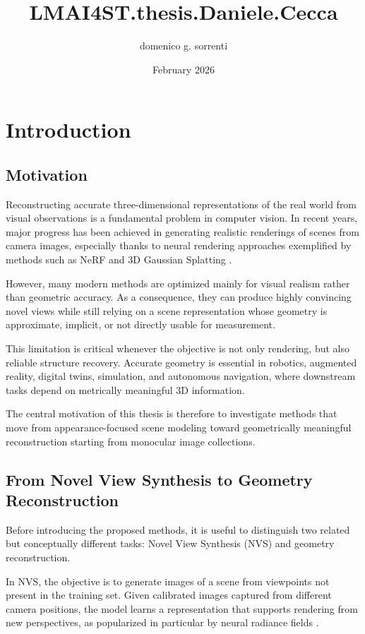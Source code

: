 \documentclass{report}
\title{LMAI4ST.thesis.Daniele.Cecca}
\author{domenico g. sorrenti}
\date{February 2026}
\begin{document}
\maketitle

\tableofcontents
\listoffigures
\listoftables

\chapter{Introduction}

\section{Motivation}
Reconstructing accurate three-dimensional representations of the real world from visual observations is a fundamental problem in computer vision. In recent years, major progress has been achieved in generating realistic renderings of scenes from camera images, especially thanks to neural rendering approaches exemplified by methods such as NeRF \cite{mildenhall2020nerf} and 3D Gaussian Splatting \cite{kerbl2023gaussian}.

However, many modern methods are optimized mainly for visual realism rather than geometric accuracy. As a consequence, they can produce highly convincing novel views while still relying on a scene representation whose geometry is approximate, implicit, or not directly usable for measurement.

This limitation is critical whenever the objective is not only rendering, but also reliable structure recovery. Accurate geometry is essential in robotics, augmented reality, digital twins, simulation, and autonomous navigation, where downstream tasks depend on metrically meaningful 3D information.

The central motivation of this thesis is therefore to investigate methods that move from appearance-focused scene modeling toward geometrically meaningful reconstruction starting from monocular image collections.

\section{From Novel View Synthesis to Geometry Reconstruction}
Before introducing the proposed methods, it is useful to distinguish two related but conceptually different tasks: Novel View Synthesis (NVS) and geometry reconstruction.

In NVS, the objective is to generate images of a scene from viewpoints not present in the training set. Given calibrated images captured from different camera positions, the model learns a representation that supports rendering from new perspectives, as popularized in particular by neural radiance fields \cite{mildenhall2020nerf}.
\end{document}
